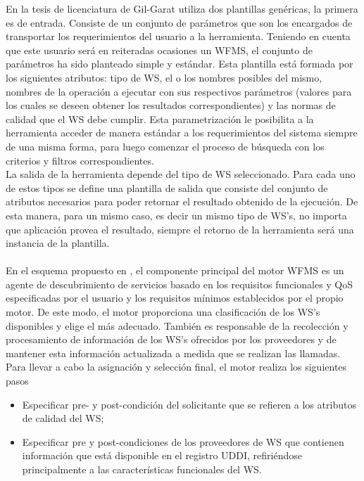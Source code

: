 En la tesis de licenciatura de Gil-Garat \cite{GG-WSfinder} utiliza dos plantillas genéricas, la primera es de entrada. Consiste de un conjunto de parámetros que son los encargados de transportar los requerimientos del usuario a la herramienta. Teniendo en cuenta que este usuario será en reiteradas ocasiones un WFMS, el conjunto de parámetros ha sido planteado simple y estándar. Esta plantilla está formada por los siguientes atributos: tipo de WS, el o los nombres posibles del mismo, nombres de la operación a ejecutar con sus respectivos parámetros (valores para los cuales se deseen obtener los resultados correspondientes) y las normas de calidad que el WS debe cumplir. Esta parametrización le posibilita a la herramienta acceder de manera estándar a los requerimientos del sistema siempre de una misma forma, para luego comenzar el proceso de búsqueda con los criterios y filtros correspondientes. \\

La salida de la herramienta depende del tipo de WS seleccionado. Para cada uno de estos tipos se define una plantilla de salida que consiste del conjunto de atributos necesarios para poder retornar el resultado obtenido de la ejecución. De esta manera, para un mismo caso, es decir un mismo tipo de WS's, no importa que aplicación provea el resultado, siempre el retorno de la herramienta será una instancia de la plantilla.\\\\


En el esquema propuesto en \cite{QoS-WS-invoked}, el componente principal del motor WFMS es un agente de descubrimiento de servicios basado en los requisitos funcionales y QoS especificadas por el usuario y los requisitos mínimos establecidos por el propio motor. De este modo, el motor proporciona una clasificación de los WS's disponibles y elige el más adecuado. También es responsable de la recolección y procesamiento de información de los WS's ofrecidos por los proveedores y de mantener esta información actualizada a medida que se realizan las llamadas. Para llevar a cabo la asignación y selección final, el motor realiza los siguientes pasos\\
\begin{itemize}
	\item Especificar pre- y post-condición del solicitante que se refieren a los atributos de calidad del WS;
	\item Especificar pre y post-condiciones de los proveedores de WS  que contienen información que está disponible en el registro UDDI, refiriéndose principalmente a las características funcionales del WS.
\end{itemize}

